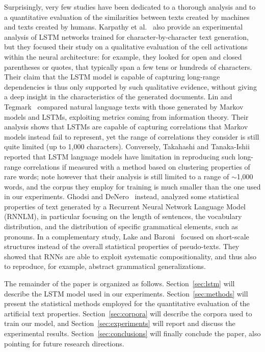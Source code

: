 \documentclass[journal]{IEEEtran}
\begin{document}
Surprisingly, very few studies have been dedicated to a thorough analysis and to a quantitative evaluation of the similarities between texts created by machines and texts created by humans. Karpathy et al.~\cite{Karpathy2015understanding} also provide an experimental analysis of LSTM networks trained for character-by-character text generation, but they focused their study on a qualitative evaluation of the cell activations within the neural architecture: for example, they looked for open and closed parentheses or quotes, that typically span a few tens or hundreds of characters. Their claim that the LSTM model is capable of capturing long-range dependencies is thus only supported by such qualitative evidence, without giving a deep insight in the characteristics of the generated documents. Lin and Tegmark~\cite{Lin2017} compared natural language texts with those generated by Markov models and LSTMs, exploiting metrics coming from information theory. Their analysis shows that LSTMs are capable of capturing correlations that Markov models instead fail to represent, yet the range of correlations they consider is still quite limited (up to 1,000 characters). Conversely, Takahashi and Tanaka-Ishii~\cite{TakaTana2017} reported that LSTM language models have limitation in reproducing such long-range correlations if measured with a method based on clustering properties of rare words; note however that their analysis is still limited to a range of $\sim$1,000 words, and the corpus they employ for training is much smaller than the one used in our experiments.
%
Ghodsi and DeNero~\cite{Ghodsi2016} instead, analyzed some statistical properties of text generated by a Recurrent Neural Network Language Model (RNNLM), in particular focusing on the length of sentences, the vocabulary distribution, and the distribution of specific grammatical elements, such as pronouns.
%
In a complementary study, Lake and Baroni~\cite{LakeBaroni2017}  focused on short-scale structures instead of the overall statistical properties of pseudo-texts. They showed that RNNs are able to exploit systematic compositionality, and thus also to reproduce, for example, abstract grammatical generalizations.

The remainder of the paper is organized as follows. Section~\ref{sec:lstm} will describe the LSTM model used in our experiments. Section~\ref{sec:methods} will present the statistical methods employed for the quantitative evaluation of the artificial text properties. Section~\ref{sec:corpora} will describe the corpora used to train our model, and Section~\ref{sec:experiments} will report and discuss the experimental results. Section~\ref{sec:conclusions} will finally conclude the paper, also pointing for future research directions.
\end{document}
